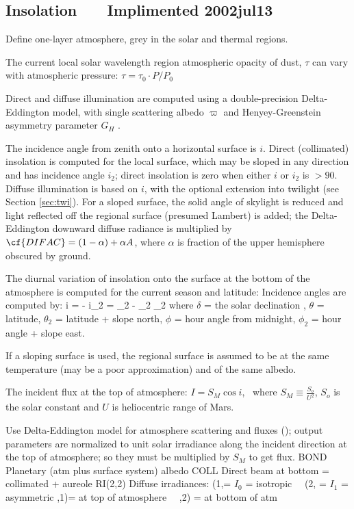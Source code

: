 
\subsection{Insolation \ \ \ Implimented 2002jul13} %
Define one-layer atmosphere, grey in the solar and thermal regions.

The current local solar wavelength region atmospheric opacity of dust, $\tau$
can vary with atmospheric pressure: $\tau = \tau_0 \cdot P/P_0$

Direct and diffuse illumination are computed using a double-precision
Delta-Eddington model, with single scattering albedo $\varpi$ and
Henyey-Greenstein asymmetry parameter $G_H$ .

The incidence angle from zenith onto a horizontal surface is $i$. Direct
(collimated) insolation is computed for the local surface, which may be sloped
in any direction and has incidence angle $i_2$; direct insolation is zero when
either $i$ or $i_2$ is $>90$\qd.  Diffuse illumination is based on $i$, with the
optional extension into twilight (see Section \ref{sec:twi}). For a sloped
surface, the solid angle of skylight is reduced and light reflected off the
regional surface (presumed Lambert) is added; the Delta-Eddington downward
diffuse radiance is multiplied by $\cf{DIFAC}=(1-\alpha) + \alpha A $, where
$\alpha$ is fraction of the upper hemisphere obscured by ground.

The diurnal variation of insolation onto the surface at the bottom of the
atmosphere is computed for the current season and latitude: 
Incidence angles are computed by:
\qbn \cos i = \sin \delta \sin \theta - \cos \delta \cos \theta \cos \phi \qen
\qbn \cos i_2 = \sin \delta \sin \theta_2 - \cos \delta \cos \theta_2 \cos \phi_2 \qen
where 
\qi $\delta$ = the solar declination ,
\qi $\theta$ = latitude, 
\qi $\theta_2$ = latitude + slope north,
\qi $\phi$ = hour angle from midnight, 
\qi $\phi_2$ = hour angle + slope east.

If a sloping surface is used, the regional surface is assumed to be at the same
temperature (may be a poor approximation) and of the same albedo.

The incident flux at the top of atmosphere: $ I = S_M  \cos i$, \  
where  $S_M \equiv \frac{S_o}{U^2} $, $S_o$ is the solar constant and $U$ is
heliocentric range of Mars.

Use Delta-Eddington model for atmosphere scattering and fluxes ();
output parameters are normalized to unit solar irradiance along the incident
direction at the top of atmosphere; so they must be multiplied by $S_M$ to get flux.
\qi  BOND      Planetary (atm plus surface system) albedo
\qi  COLL   Direct beam at bottom = collimated + aureole
\qi  RI(2,2)   Diffuse irradiances: 
\qii             (1,=  $I_0$ = isotropic  \ \  (2, =  $I_1$ = asymmetric
\qii             ,1)= at top of atmosphere  \ \  ,2) = at bottom of atm

